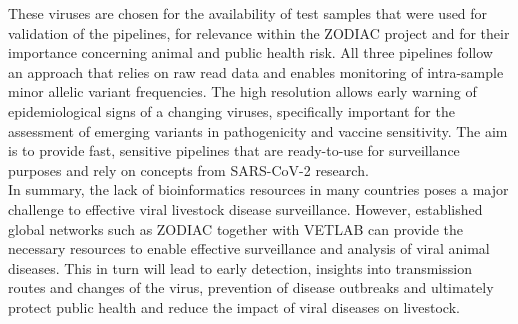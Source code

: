 These viruses are chosen for the availability of test samples that were used for validation of the pipelines, for relevance within the \ac{ZODIAC} project and for their importance concerning animal and public health risk. All three pipelines follow an approach that relies on raw read data and enables monitoring of intra-sample minor allelic variant frequencies. The high resolution allows early warning of epidemiological signs of a changing viruses, specifically important for the assessment of emerging variants in pathogenicity and vaccine sensitivity. The aim is to provide fast, sensitive pipelines that are ready-to-use for surveillance purposes and rely on concepts from \ac{SARS-CoV-2} research. \\
In summary, the lack of bioinformatics resources in many countries poses a major challenge to effective viral livestock disease surveillance. However, established global networks such as \ac{ZODIAC} together with \ac{VETLAB} can provide the necessary resources to enable effective surveillance and analysis of viral animal diseases. This in turn will lead to early detection, insights into transmission routes and changes of the virus, prevention of disease outbreaks and ultimately protect public health and reduce the impact of viral diseases on livestock.
